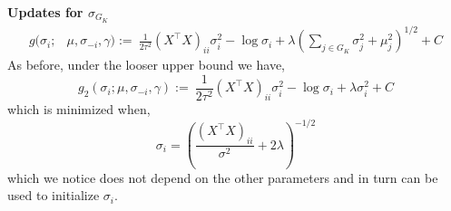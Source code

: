 \documentclass[12pt]{article}
\begin{document}
\textbf{Updates for $\sigma_{G_K}$}
\begin{equation}
\begin{aligned}
    g(\sigma_i;& \mu, \sigma_{-i}, \gamma) :=\
    \frac{1}{2\tau^2} (X^\top X)_{ii} \sigma_i^2
-
    \log{\sigma_i}
+
    \lambda \left( \sum_{j \in G_K} 
	\sigma_j^2 + \mu_j^2
    \right)^{1/2} + C
\end{aligned}
\end{equation}
As before, under the looser upper bound we have,
\begin{equation}
    g_2 (\sigma_i; \mu, \sigma_{-i}, \gamma) :=\
    \frac{1}{2\tau^2} (X^\top X)_{ii} \sigma_i^2
-
    \log{\sigma_i}
+
    \lambda \sigma_i^2 + C
\end{equation}
which is minimized when,
\begin{equation}
    \sigma_i = \left( \frac{(X^\top X)_{ii}}{\sigma^2} + 2 \lambda \right)^{-1/2}
\end{equation}
which we notice does not depend on the other parameters and in turn can be used to initialize $\sigma_i$.
\end{document}

